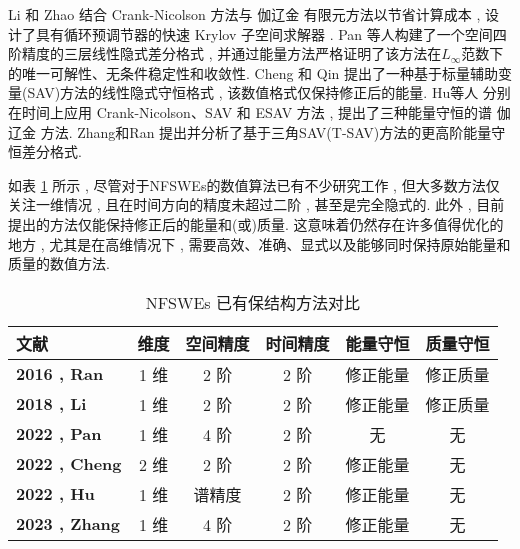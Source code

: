 Li 和 Zhao \cite{liFastEnergyConserving2018} 结合 Crank-Nicolson 方法与 伽辽金 有限元方法以节省计算成本 , 设计了具有循环预调节器的快速 Krylov 子空间求解器 . 
Pan 等人\cite{panFourthorderDifferenceScheme2022}构建了一个空间四阶精度的三层线性隐式差分格式 , 并通过能量方法严格证明了该方法在$L_{\infty}$范数下的唯一可解性、无条件稳定性和收敛性.
Cheng 和 Qin \cite{chengConvergenceEnergyconservingScheme2022} 提出了一种基于标量辅助变量(SAV)方法的线性隐式守恒格式 , 该数值格式仅保持修正后的能量.
Hu等人 \cite{huEfficientEnergyPreserving2022} 分别在时间上应用 Crank-Nicolson、SAV 和 ESAV 方法 , 提出了三种能量守恒的谱 伽辽金 方法.
Zhang和Ran \cite{zhangHighorderStructurepreservingDifference2023} 提出并分析了基于三角SAV(T-SAV)方法的更高阶能量守恒差分格式.

如表 \ref{tab:NFSWEs} 所示 , 尽管对于NFSWEs的数值算法已有不少研究工作 , 但大多数方法仅关注一维情况 , 且在时间方向的精度未超过二阶 , 甚至是完全隐式的.
此外 , 目前提出的方法仅能保持修正后的能量和(或)质量.
这意味着仍然存在许多值得优化的地方 , 尤其是在高维情况下 , 需要高效、准确、显式以及能够同时保持原始能量和质量的数值方法.
\begin{table}[htbp]
    \centering
    \small
    \caption{NFSWEs 已有保结构方法对比}
        \begin{tabular}{lccccc}
        \toprule
        \textcolor[rgb]{0 , 0 , 0}{\textbf{文献}} & \textcolor[rgb]{0 , 0 , 0}{\textbf{维度}} & \textcolor[rgb]{0 , 0 , 0}{\textbf{空间精度}} & \textcolor[rgb]{0 , 0 , 0}{\textbf{时间精度}} & \textcolor[rgb]{0 , 0 , 0}{\textbf{能量守恒}} & \textcolor[rgb]{0 , 0 , 0}{\textbf{质量守恒}} \\
        \midrule
        \textcolor[rgb]{0 , 0 , 0}{\textbf{{2016 , Ran}\cite{ranLinearlyImplicitConservative2016}}} & 1 维   & 2 阶   & 2 阶   & 修正能量  & 修正质量 \\
        \midrule
        \textcolor[rgb]{0 , 0 , 0}{\textbf{{2018 , Li}\cite{liFastEnergyConserving2018}}} & 1 维   & 2 阶   & 2 阶   & 修正能量  & 修正质量 \\
        \midrule
        \textcolor[rgb]{0 , 0 , 0}{\textbf{{2022 , Pan}\cite{panFourthorderDifferenceScheme2022}}} & 1 维   & 4 阶   & 2 阶   & 无     & 无 \\
        \midrule
        \textcolor[rgb]{0 , 0 , 0}{\textbf{{2022 , Cheng}\cite{chengConvergenceEnergyconservingScheme2022}}} & 2 维   & 2 阶   & 2 阶   & 修正能量  & 无 \\
        \midrule
        \textcolor[rgb]{0 , 0 , 0}{\textbf{{2022 , Hu}\cite{huEfficientEnergyPreserving2022}}} & 1 维   & 谱精度   & 2 阶   & 修正能量  & 无 \\
        \midrule
        \textcolor[rgb]{0 , 0 , 0}{\textbf{{2023 , Zhang}\cite{zhangHighorderStructurepreservingDifference2023}}} & 1 维   & 4 阶   & 2 阶   & 修正能量  & 无 \\
        \bottomrule
        \end{tabular}%
    \label{tab:NFSWEs}%
    \end{table}%
